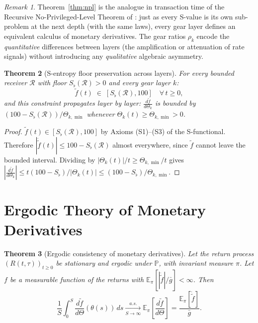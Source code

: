 \documentclass[twocolumn,11pt,a4paper]{article}
\theoremstyle{thmstyle}
\newtheorem{theorem}{Theorem}[section]
\theoremstyle{definition}
\theoremstyle{remark}
\newtheorem{remark}[theorem]{Remark}
\newcommand{\Clock}{\Theta}                  %
\newcommand{\InvClock}{\theta}               %
\newcommand{\Mdiff}[1]{\frac{d#1}{d\Clock}} %
\newcommand{\MdiffK}[2]{\frac{d#1}{d\Clock_{#2}}} %
\newcommand{\Sfloor}{S_{\flat}}              %
\newcommand{\Prob}{\mathbb{P}}
\newcommand{\Expect}{\mathbb{E}}
\begin{document}
\begin{remark}\label{rem:npl-interpretation}
Theorem~\ref{thm:npl} is the analogue in transaction time
of the Recursive No-Privileged-Level Theorem of
\citet{Sachikonye2024S}: just as every S-value is its
own sub-problem at the next depth (with the same laws),
every gear layer defines an equivalent calculus of monetary
derivatives.  The gear ratios $\rho_{k}$ encode the
\emph{quantitative} differences between layers (the
amplification or attenuation of rate signals) without
introducing any \emph{qualitative} algebraic asymmetry.
\end{remark}

\begin{theorem}[S-entropy floor preservation across layers]
\label{thm:floor-layers}
For every bounded receiver $\mathcal{R}$ with floor
$\Sfloor(\mathcal{R})>0$ and every gear layer $k$:
\begin{equation}
  \tilde{f}(t) \;\in\;
  [\Sfloor(\mathcal{R}), 100] \quad \forall\, t\geq 0,
\end{equation}
and this constraint propagates layer by layer:
$\MdiffK{\tilde{f}}{k}$ is bounded by
$(100-\Sfloor(\mathcal{R}))/\Clock_{k,\min}$
whenever $\Clock_{k}(t)\geq\Clock_{k,\min}>0$.
\end{theorem}

\begin{proof}
$\tilde{f}(t)\in[\Sfloor(\mathcal{R}),100]$ by
Axioms (S1)--(S3) of the S-functional.  Therefore
$|\dot{\tilde{f}}(t)|\leq 100-\Sfloor(\mathcal{R})$
almost everywhere, since $\tilde{f}$ cannot leave the
bounded interval.  Dividing by $|\Clock_{k}(t)|/t
\geq \Clock_{k,\min}/t$ gives
$|\MdiffK{\tilde{f}}{k}|\leq
t(100-\Sfloor)/|\Clock_{k}(t)|
\leq (100-\Sfloor)/\Clock_{k,\min}$.
\end{proof}


\section{Ergodic Theory of Monetary Derivatives}
\label{sec:ergodic}

\begin{theorem}[Ergodic consistency of monetary derivatives]
\label{thm:ergodic}
Let the return process $(R(t,\tau))_{t\geq 0}$ be
stationary and ergodic under $\Prob$, with invariant
measure $\pi$.  Let $f$ be a measurable function of
the returns with $\Expect_{\pi}[|\dot{\tilde{f}}|/\bar{g}]<\infty$.
Then
\begin{equation}\label{eq:ergodic-mderiv}
  \frac{1}{S}\int_{0}^{S}
  \Mdiff{\tilde{f}}(\InvClock(s))\,ds
  \xrightarrow[S\to\infty]{a.s.}
  \Expect_{\pi}\!\left[\Mdiff{\tilde{f}}\right]
  = \frac{\Expect_{\pi}[\dot{\tilde{f}}]}{\bar{g}}.
\end{equation}
\end{theorem}
\end{document}
